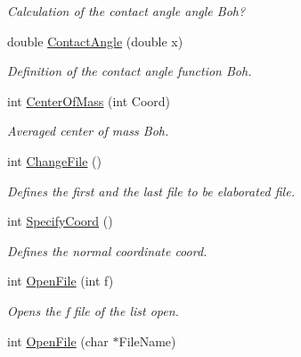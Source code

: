 \begin{DoxyCompactItemize}
\begin{DoxyCompactList}\small\item\em Calculation of the contact angle  angle Boh? \end{DoxyCompactList}\item 
double \hyperlink{classElPoly_a2dd3ba2334c4444c4ef406347618c170}{Contact\+Angle} (double x)\hypertarget{classElPoly_a2dd3ba2334c4444c4ef406347618c170}{}\label{classElPoly_a2dd3ba2334c4444c4ef406347618c170}

\begin{DoxyCompactList}\small\item\em Definition of the contact angle function Boh. \end{DoxyCompactList}\item 
int \hyperlink{classElPoly_a59529de9a660df4734a218130963ae25}{Center\+Of\+Mass} (int Coord)\hypertarget{classElPoly_a59529de9a660df4734a218130963ae25}{}\label{classElPoly_a59529de9a660df4734a218130963ae25}

\begin{DoxyCompactList}\small\item\em Averaged center of mass Boh. \end{DoxyCompactList}\item 
int \hyperlink{classElPoly_a5fa485410c0b7e02f523f96f33504435}{Change\+File} ()\hypertarget{classElPoly_a5fa485410c0b7e02f523f96f33504435}{}\label{classElPoly_a5fa485410c0b7e02f523f96f33504435}

\begin{DoxyCompactList}\small\item\em Defines the first and the last file to be elaborated  file. \end{DoxyCompactList}\item 
int \hyperlink{classElPoly_af3b99b4a504ae35256dfa33c9f1bfd31}{Specify\+Coord} ()\hypertarget{classElPoly_af3b99b4a504ae35256dfa33c9f1bfd31}{}\label{classElPoly_af3b99b4a504ae35256dfa33c9f1bfd31}

\begin{DoxyCompactList}\small\item\em Defines the normal coordinate  coord. \end{DoxyCompactList}\item 
int \hyperlink{classElPoly_a3432306726a27b310ec27b3900894b11}{Open\+File} (int f)\hypertarget{classElPoly_a3432306726a27b310ec27b3900894b11}{}\label{classElPoly_a3432306726a27b310ec27b3900894b11}

\begin{DoxyCompactList}\small\item\em Opens the f file of the list  open. \end{DoxyCompactList}\item 
int \hyperlink{classElPoly_a5ddc1cdb4d65932381030dba86448813}{Open\+File} (char $\ast$File\+Name)\hypertarget{classElPoly_a5ddc1cdb4d65932381030dba86448813}{}\label{classElPoly_a5ddc1cdb4d65932381030dba86448813}


\end{DoxyCompactItemize}

